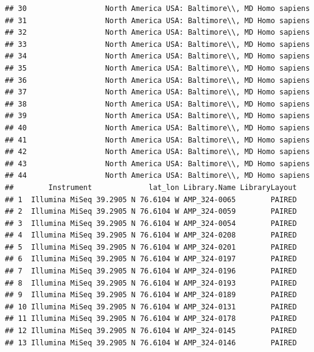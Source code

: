\documentclass[
]{article}
\begin{document}
\begin{verbatim}
## 30                  North America USA: Baltimore\\, MD Homo sapiens
## 31                  North America USA: Baltimore\\, MD Homo sapiens
## 32                  North America USA: Baltimore\\, MD Homo sapiens
## 33                  North America USA: Baltimore\\, MD Homo sapiens
## 34                  North America USA: Baltimore\\, MD Homo sapiens
## 35                  North America USA: Baltimore\\, MD Homo sapiens
## 36                  North America USA: Baltimore\\, MD Homo sapiens
## 37                  North America USA: Baltimore\\, MD Homo sapiens
## 38                  North America USA: Baltimore\\, MD Homo sapiens
## 39                  North America USA: Baltimore\\, MD Homo sapiens
## 40                  North America USA: Baltimore\\, MD Homo sapiens
## 41                  North America USA: Baltimore\\, MD Homo sapiens
## 42                  North America USA: Baltimore\\, MD Homo sapiens
## 43                  North America USA: Baltimore\\, MD Homo sapiens
## 44                  North America USA: Baltimore\\, MD Homo sapiens
##        Instrument             lat_lon Library.Name LibraryLayout
## 1  Illumina MiSeq 39.2905 N 76.6104 W AMP_324-0065        PAIRED
## 2  Illumina MiSeq 39.2905 N 76.6104 W AMP_324-0059        PAIRED
## 3  Illumina MiSeq 39.2905 N 76.6104 W AMP_324-0054        PAIRED
## 4  Illumina MiSeq 39.2905 N 76.6104 W AMP_324-0208        PAIRED
## 5  Illumina MiSeq 39.2905 N 76.6104 W AMP_324-0201        PAIRED
## 6  Illumina MiSeq 39.2905 N 76.6104 W AMP_324-0197        PAIRED
## 7  Illumina MiSeq 39.2905 N 76.6104 W AMP_324-0196        PAIRED
## 8  Illumina MiSeq 39.2905 N 76.6104 W AMP_324-0193        PAIRED
## 9  Illumina MiSeq 39.2905 N 76.6104 W AMP_324-0189        PAIRED
## 10 Illumina MiSeq 39.2905 N 76.6104 W AMP_324-0131        PAIRED
## 11 Illumina MiSeq 39.2905 N 76.6104 W AMP_324-0178        PAIRED
## 12 Illumina MiSeq 39.2905 N 76.6104 W AMP_324-0145        PAIRED
## 13 Illumina MiSeq 39.2905 N 76.6104 W AMP_324-0146        PAIRED

\end{verbatim}
\end{document}

